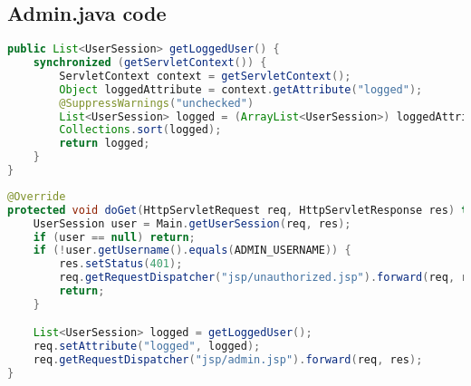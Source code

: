 \subsection{Admin.java code}
\begin{lstlisting}[language=java, caption={method to get the logged users in the context}]
public List<UserSession> getLoggedUser() {
    synchronized (getServletContext()) {
        ServletContext context = getServletContext();
        Object loggedAttribute = context.getAttribute("logged");
        @SuppressWarnings("unchecked")
        List<UserSession> logged = (ArrayList<UserSession>) loggedAttribute;
        Collections.sort(logged);
        return logged;
    }
}
\end{lstlisting}
\begin{lstlisting}[language=java, caption={GET method for admin page}]
@Override
protected void doGet(HttpServletRequest req, HttpServletResponse res) throws IOException, ServletException {
    UserSession user = Main.getUserSession(req, res);
    if (user == null) return;
    if (!user.getUsername().equals(ADMIN_USERNAME)) {
        res.setStatus(401);
        req.getRequestDispatcher("jsp/unauthorized.jsp").forward(req, res);
        return;
    }

    List<UserSession> logged = getLoggedUser();
    req.setAttribute("logged", logged);
    req.getRequestDispatcher("jsp/admin.jsp").forward(req, res);
}
\end{lstlisting}